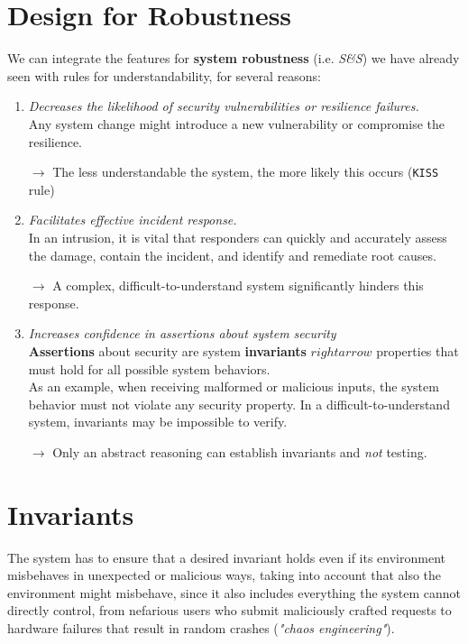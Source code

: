 \section{Design for Robustness}
We can integrate the features for \textbf{system robustness} (i.e. \textit{S\&S}) we have already seen with rules for understandability, for several reasons:
\begin{enumerate}
   \item \textit{Decreases the likelihood of security vulnerabilities or resilience failures.}\\
   Any system change might introduce a new vulnerability or compromise the resilience.

   $\longrightarrow$ The less understandable the system, the more likely this occurs (\texttt{KISS} rule)
   
   \item \textit{Facilitates effective incident response.}\\
   In an intrusion, it is vital that responders can quickly and accurately assess the
   damage, contain the incident, and identify and remediate root causes.

   $\longrightarrow$ A complex, difficult-to-understand system significantly hinders this response.
   
   \item \textit{Increases confidence in assertions about system security}\\
   \textbf{Assertions} about security are system \textbf{invariants} $rightarrow$ properties that must hold for all possible
   system behaviors.\\ 
   As an example, when receiving malformed or malicious inputs, the system behavior must not violate any security property.
   In a difficult-to-understand
   system, invariants may be impossible to verify.

   $\longrightarrow$ Only an abstract reasoning can establish invariants and \textit{not} testing.
\end{enumerate}

\section{Invariants}
The system has to ensure that a desired invariant holds
even if its environment misbehaves in unexpected or malicious ways, 
taking into account that also the environment might misbehave, 
since it also includes everything the system cannot directly control, from
nefarious users who submit maliciously crafted requests to hardware failures
that result in random crashes (\textit{"chaos engineering"}).

